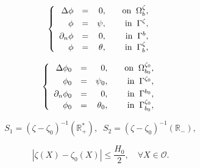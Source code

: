 \documentclass[10pt,a4paper]{amsart}
\begin{document}
\begin{equation}\label{pd3}
	\left\{
	\begin{array}{rrrrr}
		\vspace{0.1cm}
		\Delta\phi &=&0,&\quad \text{on}\; \; \Omega_{b}^{\zeta},\\
		\vspace{0.1cm}
		\phi &=&\psi,&\quad \text{in}\;\;  \Gamma^{\zeta},\\
		\partial_n\phi &=&0,&\quad \text{in}\;\;\Gamma^{b},\\
		\phi &=&\theta ,&\quad \text{in}\;\;  \Gamma^{\zeta}_b,\\
	\end{array}
	\right.
\end{equation}

\begin{equation}\label{pd4}
	\left\{
	\begin{array}{rrrrr}
		\vspace{0.1cm}
		\Delta\phi_0 &=&0,&\quad \text{on}\; \; \Omega_{b_0}^{\zeta_0},\\
		\vspace{0.1cm}
		\phi_0 &=&\psi_0,&\quad \text{in}\;\;  \Gamma^{\zeta_0},\\
		\partial_n\phi_0 &=&0,&\quad \text{in}\;\;\Gamma^{b_0},\\
		\phi _0 &=&\theta _0 ,&\quad \text{in}\;\;  \Gamma^{\zeta_0}_{b_0},\\
	\end{array}
	\right.
\end{equation}

\begin{equation}\label{defs1ands2}
	S_1=(\zeta-\zeta_0)^{-1}(\mathbb{R}^*_{+}),\;\;S_2=(\zeta-\zeta_0)^{-1}(\mathbb{R}_{-}),
\end{equation}

	\begin{equation}\label{conditiononsurfaces}
		|\zeta(X)-\zeta_0(X)|\leq \frac{H_0}{2},\quad \forall X\in \mathcal O .  
	\end{equation}
\end{document}
